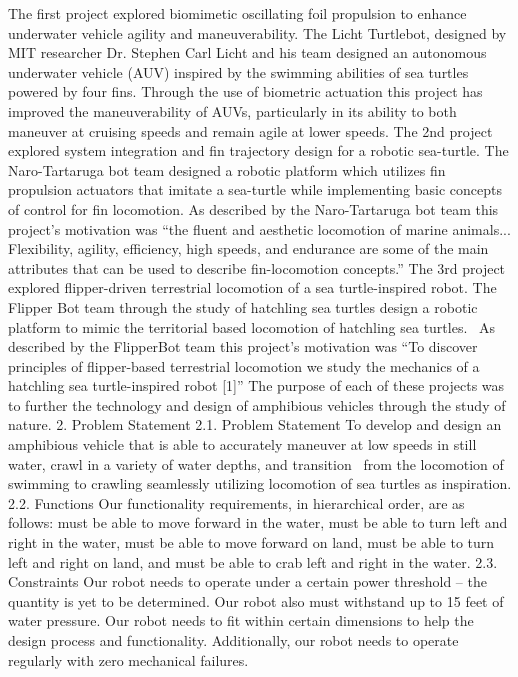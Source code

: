 The first project explored biomimetic oscillating foil propulsion to enhance underwater vehicle agility and maneuverability. The Licht Turtlebot, designed by MIT researcher Dr. Stephen Carl Licht and his team designed an autonomous underwater vehicle (AUV) inspired by the swimming abilities of sea turtles powered by four fins. Through the use of biometric actuation this project has improved the maneuverability of AUVs, particularly in its ability to both maneuver at cruising speeds and remain agile at lower speeds. The 2nd project explored system integration and fin trajectory design for a robotic sea-turtle. The Naro-Tartaruga bot team designed a robotic platform which utilizes fin propulsion actuators that imitate a sea-turtle while implementing basic concepts of control for fin locomotion. As described by the Naro-Tartaruga bot team this project's motivation was “the fluent and aesthetic locomotion of marine animals... Flexibility, agility, efficiency, high speeds, and endurance are some of the main attributes that can be used to describe fin-locomotion concepts.” The 3rd project explored flipper-driven terrestrial locomotion of a sea turtle-inspired robot. The Flipper Bot team through the study of hatchling sea turtles design a robotic platform to mimic the territorial based locomotion of hatchling sea turtles.  As described by the FlipperBot team this project's motivation was “To discover principles of flipper-based terrestrial locomotion we study the mechanics of a hatchling sea turtle-inspired robot [1]” The purpose of each of these projects was to further the technology and design of amphibious vehicles through the study of nature.
    2. Problem Statement
        2.1. Problem Statement
To develop and design an amphibious vehicle that is able to accurately maneuver at low speeds in still water, crawl in a variety of water depths, and transition  from the locomotion of swimming to crawling seamlessly utilizing locomotion of sea turtles as inspiration.
        2.2. Functions
Our functionality requirements, in hierarchical order, are as follows: must be able to move forward in the water, must be able to turn left and right in the water, must be able to move forward on land, must be able to turn left and right on land, and must be able to crab left and right in the water.
        2.3. Constraints
Our robot needs to operate under a certain power threshold – the quantity is yet to be determined. Our robot also must withstand up to 15 feet of water pressure. Our robot needs to fit within certain dimensions to help the design process and functionality. Additionally, our robot needs to operate regularly with zero mechanical failures. 


